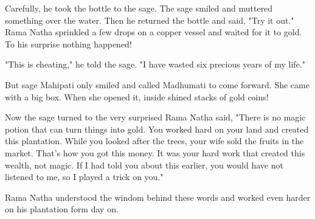 \par
Carefully, he took the bottle to the sage. The sage smiled and muttered something over the water. Then he returned the bottle and said, "Try it out." Rama Natha sprinkled a few drops on a copper vessel and waited for it to gold. To his surprise nothing happened!
\par
"This is cheating," he told the sage. "I have wasted six precious years of my life."
\par
But sage Mahipati only smiled and called Madhumati to come forward. She came with a big box. When she opened it, inside shined stacks of gold coins!
\par
Now the sage turned to the very surprised Rama Natha said, "There is no magic potion that can turn things into gold. You worked hard on your land and created this plantation. While you looked after the trees, your wife sold the fruits in the market. That's how you got this money. It was your hard work that created this wealth, not magic. If I had told you about this earlier, you would have not listened to me, so I played a trick on you."
\par
Rama Natha understood the windom behind these words and worked even harder on his plantation form day on.